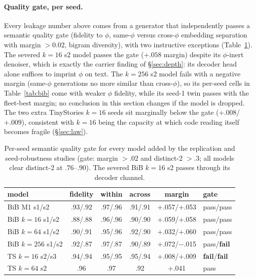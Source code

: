 \documentclass[11pt]{article}
\begin{document}
\paragraph{Quality gate, per seed.} Every leakage number above comes from
a generator that independently passes a semantic quality gate (fidelity to
$\phi$, same-$\phi$ versus cross-$\phi$ embedding separation with margin
$>0.02$, bigram diversity), with two instructive exceptions
(Table~\ref{tab:quality}). The severed $k{=}16$ s2 model passes the gate
($+.058$ margin) despite its $\phi$-inert denoiser, which is exactly the
carrier finding of \S\ref{sec:depth}: its decoder head alone suffices to
imprint $\phi$ on text. The $k{=}256$ s2 model fails with a negative
margin (same-$\phi$ generations no more similar than cross-$\phi$), so its
per-seed cells in Table~\ref{tab:bib} come with weaker $\phi$ fidelity,
while its seed-1 twin passes with the fleet-best margin; no conclusion in
this section changes if the model is dropped. The two extra TinyStories
$k{=}16$ seeds sit marginally below the gate ($+.008$/$+.009$), consistent
with $k{=}16$ being the capacity at which code reading itself becomes
fragile (\S\ref{sec:law}).

\begin{table}[h]\centering\small
\begin{tabular}{l cccc l}
model & fidelity & within & across & margin & gate \\
\hline
BiB M1 s1/s2          & .93/.92 & .97/.96 & .91/.91 & $+$.057/$+$.053 & pass/pass \\
BiB $k{=}16$ s1/s2    & .88/.88 & .96/.96 & .90/.90 & $+$.059/$+$.058 & pass/pass \\
BiB $k{=}64$ s1/s2    & .90/.91 & .95/.96 & .92/.90 & $+$.032/$+$.060 & pass/pass \\
BiB $k{=}256$ s1/s2   & .92/.87 & .97/.87 & .90/.89 & $+$.072/$-$.015 & pass/\textbf{fail} \\
TS $k{=}16$ s2/s3     & .94/.94 & .95/.95 & .95/.94 & $+$.008/$+$.009 & \textbf{fail}/\textbf{fail} \\
TS $k{=}64$ s2        & .96     & .97     & .92     & $+$.041         & pass \\
\end{tabular}
\caption{Per-seed semantic quality gate for every model added by the
replication and seed-robustness studies (gate: margin $>.02$ and
distinct-2 $>.3$; all models clear distinct-2 at $.76$--$.90$). The
severed BiB $k{=}16$ s2 passes through its decoder channel.}
\label{tab:quality}
\end{table}
\end{document}

